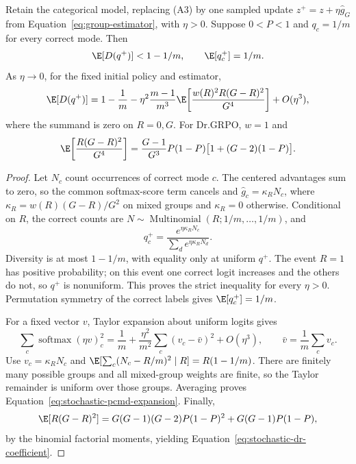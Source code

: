 \begin{proposition}
\enforcehalffinalproseline
\label{prop:stochastic-pcmd}
Retain the categorical model, replacing (A3) by one sampled update
$z^+=z+\eta\widehat g_G$ from Equation~\eqref{eq:group-estimator}, with
$\eta>0$. Suppose $0<P<1$ and $q_c=1/m$ for every correct mode. Then
\begin{equation}
 \E[D(q^+)]<1-1/m,
 \qquad \E[q_c^+]=1/m.
 \label{eq:stochastic-strict-decrease}
\end{equation}
As $\eta\to0$, for the fixed initial policy and estimator,
\begin{equation}
 \E[D(q^+)]
 =1-\frac1m
  -\eta^2\frac{m-1}{m^3}
    \E\!\left[\frac{w(R)^2R(G-R)^2}{G^4}\right]
  +O(\eta^3),
 \label{eq:stochastic-pcmd-expansion}
\end{equation}
where the summand is zero on $R=0,G$. For Dr.GRPO, $w=1$ and
\begin{equation}
 \E\!\left[\frac{R(G-R)^2}{G^4}\right]
 =\frac{G-1}{G^3}P(1-P)\big[1+(G-2)(1-P)\big].
 \label{eq:stochastic-dr-coefficient}
\end{equation}
\end{proposition}

\begin{proof}
\enforcehalffinalproseline
Let $N_c$ count occurrences of correct mode $c$. The centered advantages
sum to zero, so the common softmax-score term cancels and
$\widehat g_c=\kappa_RN_c$, where
$\kappa_R=w(R)(G-R)/G^2$ on mixed groups and $\kappa_R=0$ otherwise.
Conditional on $R$, the correct counts are
$N\sim\operatorname{Multinomial}(R;1/m,\ldots,1/m)$, and
\[
 q_c^+=\frac{e^{\eta\kappa_RN_c}}{\sum_de^{\eta\kappa_RN_d}}.
\]
Diversity is at most $1-1/m$, with equality only at uniform $q^+$.
The event $R=1$ has positive probability; on this event one correct logit
increases and the others do not, so $q^+$ is nonuniform. This proves the
strict inequality for every $\eta>0$. Permutation symmetry of the correct
labels gives $\E[q_c^+]=1/m$.

For a fixed vector $v$, Taylor expansion about uniform logits gives
\[
 \sum_c\operatorname{softmax}(\eta v)_c^2
 =\frac1m+\frac{\eta^2}{m^2}\sum_c(v_c-\bar v)^2+O(\eta^3),
 \qquad \bar v=\frac1m\sum_cv_c.
\]
Use $v_c=\kappa_RN_c$ and
$\E[\sum_c(N_c-R/m)^2\mid R]=R(1-1/m)$.
There are finitely many possible groups and all mixed-group weights are
finite, so the Taylor remainder is uniform over those groups. Averaging
proves Equation~\eqref{eq:stochastic-pcmd-expansion}.
Finally,
\[
 \E[R(G-R)^2]
 =G(G-1)(G-2)P(1-P)^2+G(G-1)P(1-P),
\]
by the binomial factorial moments, yielding
Equation~\eqref{eq:stochastic-dr-coefficient}.
\end{proof}


